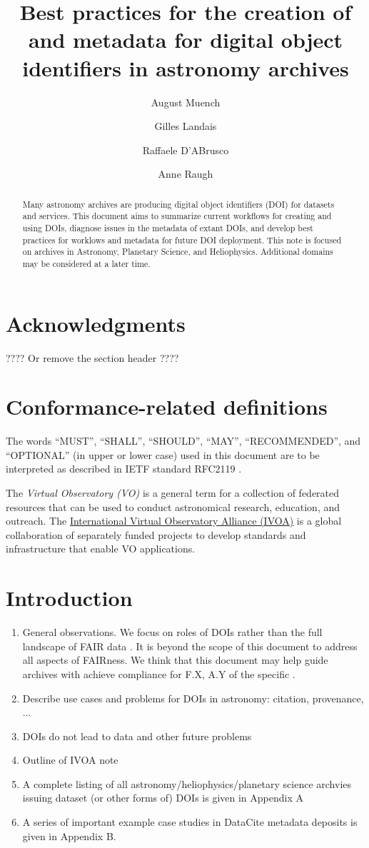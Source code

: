 \documentclass[11pt,a4paper]{ivoa}
\title{Best practices for the creation of and metadata for digital object identifiers in astronomy archives}
\author[https://orcid.org/0000-0003-0666-6367]{August Muench}
\author[]{Gilles Landais}
\author[]{Raffaele D'ABrusco}
\author[]{Anne Raugh}
\begin{document}

\begin{abstract}
Many astronomy archives are producing digital object identifiers (DOI) for datasets and services.
This document aims to summarize current workflows for creating and using DOIs, 
diagnose issues in the metadata of extant DOIs, 
and develop best practices for worklows and metadata for future DOI deployment.
This note is focused on archives in Astronomy, Planetary Science, and Heliophysics. 
Additional domains may be considered at a later time.
\end{abstract}


\section*{Acknowledgments}

???? Or remove the section header ????

\section*{Conformance-related definitions}

The words ``MUST'', ``SHALL'', ``SHOULD'', ``MAY'', ``RECOMMENDED'', and
``OPTIONAL'' (in upper or lower case) used in this document are to be
interpreted as described in IETF standard RFC2119 \citep{std:RFC2119}.

The \emph{Virtual Observatory (VO)} is a
general term for a collection of federated resources that can be used
to conduct astronomical research, education, and outreach.
The \href{https://www.ivoa.net}{International
Virtual Observatory Alliance (IVOA)} is a global
collaboration of separately funded projects to develop standards and
infrastructure that enable VO applications.


\section{Introduction}

\begin{enumerate}
\item General observations. 
We focus on roles of DOIs rather than the full landscape of FAIR data \citep[e.g.,][]{Wilkinson2016}. 
It is beyond the scope of this document to address all aspects of FAIRness.
We think that this document may help guide archives with achieve compliance for F.X, A.Y of the specific .
\item Describe use cases and problems for DOIs in astronomy: citation, provenance, ...
\item DOIs do not lead to data and other future problems
\item Outline of IVOA note
\item A complete listing of all astronomy/heliophysics/planetary science archvies issuing dataset (or other forms of) DOIs is given in Appendix A
\item A series of important example case studies in DataCite metadata deposits is given in Appendix B.
\end{enumerate}
\end{document}
